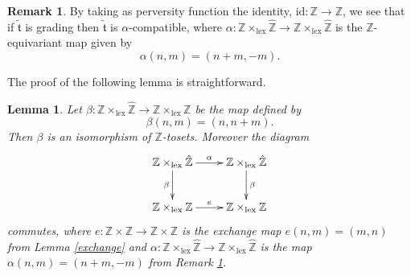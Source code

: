 \documentclass{article}
\newtheorem{prop}[thm]{Proposition}
\newtheorem{lem}[thm]{Lemma}
\theoremstyle{definition}
\newtheorem{rem}[thm]{Remark}
\newcommand{\Z}{\mathbb{Z}}
\newcommand{\tee}{\mathfrak{t}}
\begin{document}

\begin{rem}\label{alpha}
By taking as perversity function the identity, $\mathrm{id}\colon \Z\to \Z$, we see that if $\tilde{\tee}$ is grading then $\tilde{\tee}$ is $\alpha$-compatible, where $\alpha\colon \mathbb{Z} \times_{\mathrm{lex}} \hat{\mathbb{Z}}\to \mathbb{Z} \times_{\mathrm{lex}} \hat{\mathbb{Z}}$ is the $\Z$-equivariant map given by
\[
\alpha(n,m)=(n+m,-m).
\]
\end{rem}

The proof of the following lemma is straightforward.
\begin{lem}\label{from-alpha-to-e}
Let $\beta\colon \mathbb{Z} \times_{\mathrm{lex}} \hat{\mathbb{Z}}\to \mathbb{Z} \times_{\mathrm{lex}} {\mathbb{Z}}$ be the map defined by
\[
\beta(n,m)=(n,n+m).
\]
Then $\beta$ is an isomorphism of $\Z$-tosets. Moreover the diagram
\[
\xymatrix{
\mathbb{Z} \times_{\mathrm{lex}} \hat{\mathbb{Z}}\ar[r]^{\alpha}\ar[d]_{\beta}& \mathbb{Z} \times_{\mathrm{lex}} \hat{\mathbb{Z}}\ar[d]^{\beta}\\
\mathbb{Z} \times_{\mathrm{lex}} {\mathbb{Z}}\ar[r]^{e}& \mathbb{Z} \times_{\mathrm{lex}} {\mathbb{Z}}
}
\]
commutes,
where $e\colon \Z\times \Z \to \Z\times \Z$ is the exchange map $e(n,m)=(m,n)$ from Lemma \ref{exchange} and $\alpha\colon \mathbb{Z} \times_{\mathrm{lex}} \hat{\mathbb{Z}}\to \mathbb{Z} \times_{\mathrm{lex}} \hat{\mathbb{Z}}$ is the map $\alpha(n,m)=(n+m,-m)$ from Remark \ref{alpha}.
\end{lem}
\end{document}
